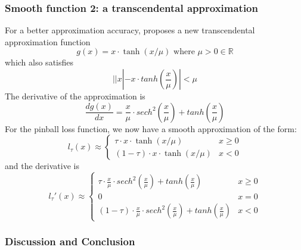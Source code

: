 \subsubsection{Smooth function 2: a transcendental approximation}
\label{subsec: smooth_new}

For a better approximation accuracy, \citeauthor{bagulSMOOTHTRANSCENDENTALAPPROXIMATION2017}\cite{bagulSMOOTHTRANSCENDENTALAPPROXIMATION2017} proposes a new transcendental approximation function 
 \begin{equation}
    g(x) = x \cdot \tanh(x/\mu) \text{  where } \mu > 0 \in \mathbb{R}
 \end{equation}
which also satisfies
\begin{equation}
    ||x| - x \cdot tanh(\frac{x}{\mu})| < \mu
\end{equation}
The derivative of the approximation is
\begin{equation}
    \frac{dg(x)}{dx} = \frac{x}{\mu} \cdot sech^2 (\frac{x}{\mu}) + tanh(\frac{x}{\mu})
\end{equation}
For the pinball loss function, we now have a smooth approximation of the form:
\begin{equation}
    l_\tau(x) \approx 
    \begin{cases}
        \tau \cdot x \cdot \tanh(x/\mu) & {x\geq 0}\\
        (1-\tau) \cdot x \cdot \tanh(x/\mu) & {x < 0}
    \end{cases}
\end{equation}
and the derivative is
\begin{equation}
\label{eq:smooth_new_d}
    l_\tau\prime(x) \approx 
    \begin{cases}
        \tau \cdot \frac{x}{\mu} \cdot sech^2 (\frac{x}{\mu}) + tanh(\frac{x}{\mu}) & {x\geq 0}\\
        0 & {x=0}\\
        (1-\tau) \cdot \frac{x}{\mu} \cdot sech^2 (\frac{x}{\mu}) + tanh(\frac{x}{\mu}) & {x < 0}
    \end{cases}
\end{equation}
\subsubsection{Discussion and Conclusion}

